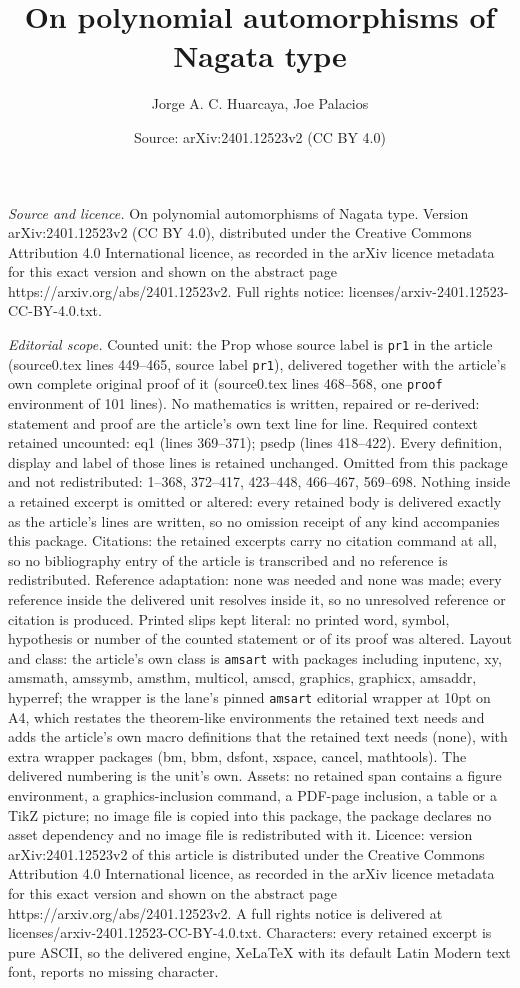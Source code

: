 \documentclass[10pt,a4paper]{amsart}
\title[On polynomial automorphisms of Nagata type]{On polynomial automorphisms of Nagata type}
\author{Jorge A. C. Huarcaya, Joe Palacios}
\date{Source: arXiv:2401.12523v2 (CC BY 4.0)}
\begin{document}
\maketitle

\noindent\emph{Source and licence.} On polynomial automorphisms of Nagata type. Version arXiv:2401.12523v2 (CC BY 4.0), distributed under the Creative Commons Attribution 4.0 International licence, as recorded in the arXiv licence metadata for this exact version and shown on the abstract page https://arxiv.org/abs/2401.12523v2. Full rights notice: licenses/arxiv-2401.12523-CC-BY-4.0.txt.\par\smallskip

\noindent\textit{Editorial scope.} Counted unit: the Prop whose source label is \texttt{pr1} in the article (source0.tex lines 449--465, source label \texttt{pr1}), delivered together with the article's own complete original proof of it (source0.tex lines 468--568, one \texttt{proof} environment of 101 lines). No mathematics is written, repaired or re-derived: statement and proof are the article's own text line for line. Required context retained uncounted: eq1 (lines 369--371); psedp (lines 418--422). Every definition, display and label of those lines is retained unchanged. Omitted from this package and not redistributed: 1--368, 372--417, 423--448, 466--467, 569--698. Nothing inside a retained excerpt is omitted or altered: every retained body is delivered exactly as the article's lines are written, so no omission receipt of any kind accompanies this package. Citations: the retained excerpts carry no citation command at all, so no bibliography entry of the article is transcribed and no reference is redistributed. Reference adaptation: none was needed and none was made; every reference inside the delivered unit resolves inside it, so no unresolved reference or citation is produced. Printed slips kept literal: no printed word, symbol, hypothesis or number of the counted statement or of its proof was altered. Layout and class: the article's own class is \texttt{amsart} with packages including inputenc, xy, amsmath, amssymb, amsthm, multicol, amscd, graphics, graphicx, amsaddr, hyperref; the wrapper is the lane's pinned \texttt{amsart} editorial wrapper at 10pt on A4, which restates the theorem-like environments the retained text needs and adds the article's own macro definitions that the retained text needs (none), with extra wrapper packages (bm, bbm, dsfont, xspace, cancel, mathtools). The delivered numbering is the unit's own. Assets: no retained span contains a figure environment, a graphics-inclusion command, a PDF-page inclusion, a table or a TikZ picture; no image file is copied into this package, the package declares no asset dependency and no image file is redistributed with it. Licence: version arXiv:2401.12523v2 of this article is distributed under the Creative Commons Attribution 4.0 International licence, as recorded in the arXiv licence metadata for this exact version and shown on the abstract page https://arxiv.org/abs/2401.12523v2. A full rights notice is delivered at licenses/arxiv-2401.12523-CC-BY-4.0.txt. Characters: every retained excerpt is pure ASCII, so the delivered engine, XeLaTeX with its default Latin Modern text font, reports no missing character.
\end{document}
